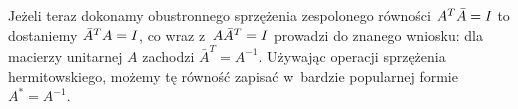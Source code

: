 \documentclass[a4paper,11pt]{article}
\begin{document}
Jeżeli teraz dokonamy obustronnego sprzężenia zespolonego równości
$A^{ T } \bar{A} = I$ to dostaniemy $\bar{A}^{ T } A = I$, co
wraz z~$A \bar{A}^{ T } = I$ prowadzi do znanego wniosku: dla
macierzy unitarnej $A$ zachodzi $\bar{A}^{ T } = A^{ -1 }$. Używając
operacji sprzężenia hermitowskiego, możemy tę równość zapisać w~bardzie
popularnej formie $A^{ * } = A^{ -1 }$.

\vspace{\spaceFour}







\end{document}
